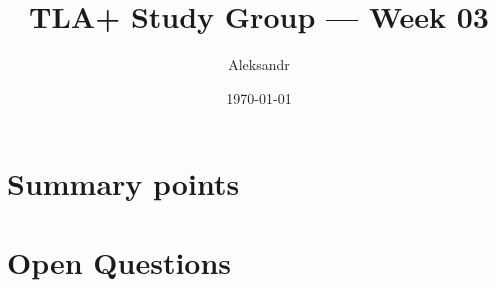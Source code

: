 \documentclass[11pt]{article}
\title{TLA+ Study Group — Week 03}
\author{Aleksandr}
\date{\today}
\begin{document}
\maketitle

\section*{Summary points}
\begin{itemize}
\end{itemize}

\section*{Open Questions}
\begin{itemize}
\end{itemize}
\end{document}
